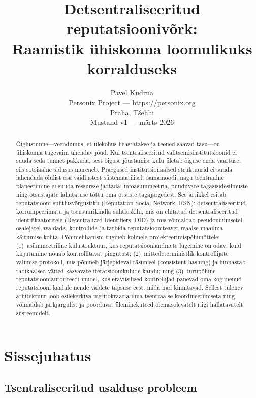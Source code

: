 \documentclass[11pt,a4paper,twocolumn]{article}
\title{\textbf{Detsentraliseeritud reputatsioonivõrk:\\Raamistik ühiskonna loomulikuks korralduseks}}
\author{Pavel Kudrna\\Personix Project --- \url{https://personix.org}\\Praha, Tšehhi\\Mustand v1 --- märts 2026}
\date{}
\begin{document}
\maketitle

\begin{abstract}
Õiglustunne---veendumus, et ülekohus heastatakse ja teened saavad tasu---on ühiskonna tugevaim ühendav jõud. Kui tsentraliseeritud valitsemisinstitutsioonid ei suuda seda tunnet pakkuda, sest õiguse jõustamise kulu ületab õiguse enda väärtuse, siis sotsiaalne sidusus mureneb. Praegused institutsionaalsed struktuurid ei suuda lahendada olulist osa vaidlustest süstemaatiliselt samamoodi, nagu tsentraalne planeerimine ei suuda ressursse jaotada: infoasümmeetria, puuduvate tagasisidesilmuste ning otsustajate lahutatuse tõttu oma otsuste tagajärgedest. See artikkel esitab reputatsiooni-suhtlusvõrgustiku (Reputation Social Network, RSN): detsentraliseeritud, korrumpeerimatu ja tsensuurikindla suhtluskihi, mis on ehitatud detsentraliseeritud identifikaatoritele (Decentralized Identifiers, DID) ja mis võimaldab pseudonüümsetel osalejatel avaldada, kontrollida ja tarbida reputatsiooniteavet reaalse maailma käitumise kohta. Põhimehhanism tugineb kolmele projekteerimispõhimõttele: (1)~asümmeetriline kulustruktuur, kus reputatsiooniandmete lugemine on odav, kuid kirjutamine nõuab kontrollitavat pingutust; (2)~mittedeterministlik kontrollijate valimise protokoll, mis põhineb järjepideval räsimisel (consistent hashing) ja hinnastab radikaalsed väited kasvavate iteratsioonikulude kaudu; ning (3)~turupõhine reputatsiooniautoriteedi mudel, kus eraviisilised kontrollijad panevad oma kogunenud reputatsiooni kaalule nende väidete täpsuse eest, mida nad kinnitavad. Sellest tulenev arhitektuur loob esilekerkiva meritokraatia ilma tsentraalse koordineerimiseta ning võimaldab järkjärgulist ja pöörduvat üleminekuteed olemasolevatelt riigi hallatavatelt süsteemidelt.
\end{abstract}

\section{Sissejuhatus}

\subsection{Tsentraliseeritud usalduse probleem}
\end{document}

